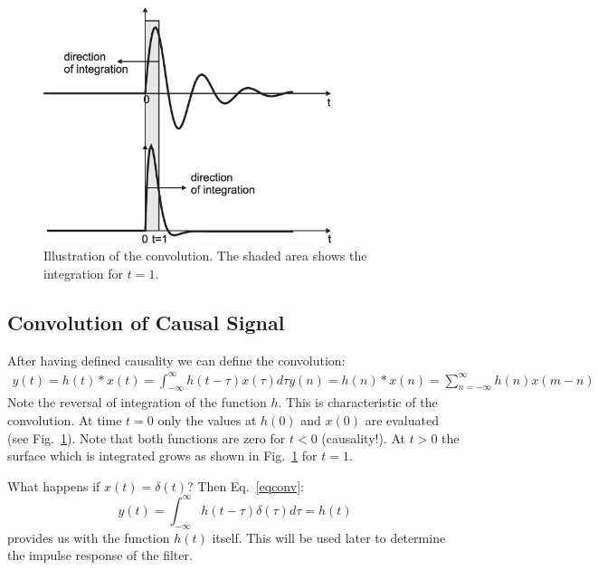 \documentclass[12pt,a4paper]{article}
\begin{document}
\begin{figure}[!hbt]
\begin{center}
\mbox{\includegraphics[width=0.75\textwidth]{convol}}
\end{center}
\caption{Illustration of the convolution. The shaded area
shows the integration for $t=1$.
\label{convolution}}
\end{figure}




\subsection{Convolution of Causal Signal}
After having defined causality we can define the convolution:
\begin{eqnarray} 
  y(t) = h(t) * x(t) = \int_{-\infty}^{\infty} h(t - \tau) x(\tau) d\tau
  y(n) = h(n) * x(n) = \sum_{n = -\infty}^\infty h(n) x(m - n)
\label{eqconv}
\end{eqnarray}
Note the reversal of integration of the function $h$. This
is characteristic of the convolution. At time $t=0$
only the values at $h(0)$ and $x(0)$ are evaluated 
(see Fig.~\ref{convolution}). Note
that both functions are zero for $t<0$ (causality!).
At $t>0$ the surface which is integrated grows as shown
in Fig.~\ref{convolution} for $t=1$.

What happens if $x(t)=\delta(t)$? Then Eq.~\ref{eqconv}:
\begin{equation} 
y(t) = \int_{-\infty}^{\infty} h(t - \tau) \delta(\tau) d\tau = h(t)
\label{convdelta}
\end{equation}
provides us with the function $h(t)$ itself. This will
be used later to determine the impulse response of the
filter.
\end{document}
